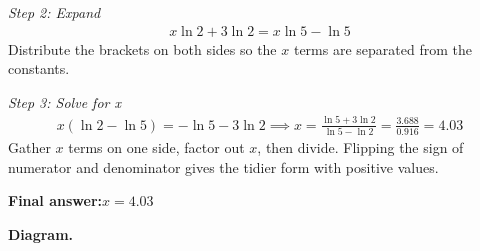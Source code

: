 \documentclass[11pt]{article}
\begin{document}
\textit{Step 2: Expand}
\[\begin{gathered}
x\ln 2 + 3\ln 2 = x\ln 5 - \ln 5
\end{gathered}\]
Distribute the brackets on both sides so the \( x \) terms are separated from the constants.

\textit{Step 3: Solve for x}
\[\begin{gathered}
x(\ln 2 - \ln 5) = -\ln 5 - 3\ln 2 \implies x = \frac{\ln 5 + 3\ln 2}{\ln 5 - \ln 2} = \frac{3.688}{0.916} = 4.03
\end{gathered}\]
Gather \( x \) terms on one side, factor out \( x \), then divide. Flipping the sign of numerator and denominator gives the tidier form with positive values.

\begin{answerbox}
\textbf{Final answer:}\quad \(\displaystyle x = 4.03\)
\end{answerbox}
\textbf{Diagram.}
\end{document}
